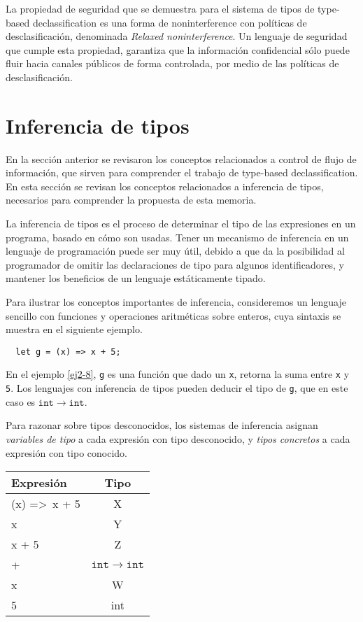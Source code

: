 La propiedad de seguridad que se demuestra para el sistema de tipos de type-based declassification es una forma de noninterference con políticas de desclasificación, denominada \emph{Relaxed noninterference}. Un lenguaje de seguridad que cumple esta propiedad, garantiza que la información confidencial sólo puede fluir hacia canales públicos de forma controlada, por medio de las políticas de desclasificación.

\section{Inferencia de tipos} \label{inference}
En la sección anterior se revisaron los conceptos relacionados a control de flujo de información, que sirven para comprender el trabajo de type-based declassification. En esta sección se revisan los conceptos relacionados a inferencia de tipos, necesarios para comprender la propuesta de esta memoria.

La inferencia de tipos es el proceso de determinar el tipo de las expresiones en un programa, basado en cómo son usadas. Tener un mecanismo de inferencia en un lenguaje de programación puede ser muy útil, debido a que da la posibilidad al programador de omitir las declaraciones de tipo para algunos identificadores, y mantener los beneficios de un lenguaje estáticamente tipado.

Para ilustrar los conceptos importantes de inferencia, consideremos un lenguaje sencillo con funciones y operaciones aritméticas sobre enteros, cuya sintaxis se muestra en el siguiente ejemplo.
\vspace{0.8em}
\begin{ej}
  \normalfont
  \label{ej2-8}
\begin{lstlisting}
  let g = (x) => x + 5;
\end{lstlisting}
\end{ej}

En el ejemplo \ref{ej2-8}, \texttt{g} es una función que dado un \texttt{x}, retorna la suma entre \texttt{x} y \texttt{5}. Los lenguajes con inferencia de tipos pueden deducir el tipo de \texttt{g}, que en este caso es $\mathtt{int \rightarrow int}$.

Para razonar sobre tipos desconocidos, los sistemas de inferencia asignan \emph{variables de tipo} a cada expresión con tipo desconocido, y \emph{tipos concretos} a cada expresión con tipo conocido.

\begin{center}
  \ttfamily
  \begin{tabular}{l c}
    Expresión & Tipo \\
    \hline
    (x) =>\ x + 5 & X \\
    x & Y \\
    x + 5 & Z \\
    + & $\mathtt{int \rightarrow int}$ \\
    x & W \\
    5 & int \\
  \end{tabular}
\end{center}


